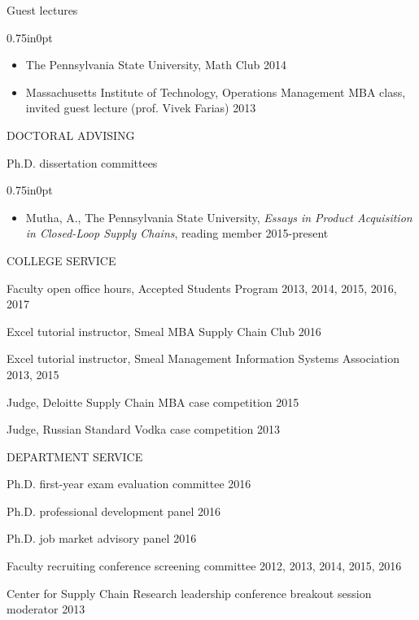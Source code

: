 \documentclass[letterpaper,11pt,oneside]{article}
\newcommand\myIndent{0.75in}
\newcommand\myParSkip{3pt}
\newcommand\myHangIndent{1in}
\newcommand\mySpaceBeforeSection{0.9em}
\newcommand{\NiceIndent}{ \parindent=\myIndent \hangindent=\myHangIndent }
\newenvironment{miniListBullet}
    {
        \begin{adjustwidth}{\myIndent}{0pt}
        \setlength{\parskip}{0pt}%
        \renewcommand\labelitemi{{\boldmath$\cdot$}}
        \begin{itemize}
        \setlength\itemsep{0em}
    }
    {
        \end{itemize}
        \setlength{\parskip}{\myParSkip}%
        \end{adjustwidth}
    }
\begin{document}
\NiceIndent Guest lectures
\begin{miniListBullet}
    \item The Pennsylvania State University, Math Club 2014
    \item Massachusetts Institute of Technology, Operations Management MBA class, invited guest lecture (prof. Vivek Farias) 2013
\end{miniListBullet}

\vspace{\mySpaceBeforeSection}
\noindent DOCTORAL ADVISING

\NiceIndent Ph.D. dissertation committees
\begin{miniListBullet}
    \item Mutha, A., The Pennsylvania State University, \textit{Essays in Product Acquisition in Closed-Loop Supply Chains}, reading member 2015-present
\end{miniListBullet}

\vspace{\mySpaceBeforeSection}
\noindent COLLEGE SERVICE

\NiceIndent Faculty open office hours, Accepted Students Program 2013, 2014, 2015, 2016, 2017

\NiceIndent Excel tutorial instructor, Smeal MBA Supply Chain Club 2016

\NiceIndent Excel tutorial instructor, Smeal Management Information Systems Association 2013, 2015

\NiceIndent Judge, Deloitte Supply Chain MBA case competition  2015

\NiceIndent Judge, Russian Standard Vodka case competition  2013

\vspace{\mySpaceBeforeSection}
\noindent DEPARTMENT SERVICE

\NiceIndent Ph.D. first-year exam evaluation committee 2016

\NiceIndent Ph.D. professional development panel 2016

\NiceIndent Ph.D. job market advisory panel 2016

\NiceIndent Faculty recruiting conference screening committee 2012, 2013, 2014, 2015, 2016

\NiceIndent Center for Supply Chain Research leadership conference breakout session moderator 2013
\end{document}
